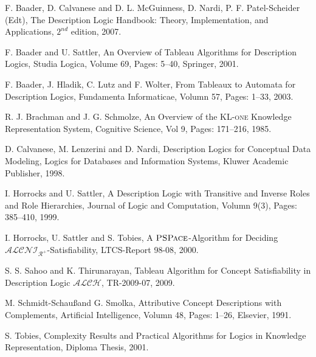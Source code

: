 \documentclass[12pt,a4paper]{report}
\begin{document}
\begin{thebibliography}{10}

F. Baader, D. Calvanese and D. L. McGuinness, D. Nardi, P. F. Patel-Scheider (Edt), The Description Logic Handbook: Theory, Implementation, and Applications, $2^{nd}$ edition, 2007.

F. Baader and U. Sattler, An Overview of Tableau Algorithms for Description Logics, Studia Logica, Volume 69, Pages: 5--40, Springer, 2001.

F. Baader, J. Hladik, C. Lutz and F. Wolter, From Tableaux to Automata for Description Logics, Fundamenta Informaticae, Volumn 57, Pages: 1--33, 2003.

R. J. Brachman and J. G. Schmolze, An Overview of  the  \textsc{KL-one} Knowledge  Representation System, Cognitive Science, Vol 9, Pages: 171--216, 1985.

D. Calvanese, M. Lenzerini and D. Nardi, Description Logics for Conceptual Data Modeling, Logics for Databases and Information Systems, Kluwer Academic Publisher, 1998.

I. Horrocks and U. Sattler, A Description Logic with Transitive and Inverse Roles and Role Hierarchies, Journal of Logic and Computation, Volumn 9(3), Pages: 385--410, 1999.

I. Horrocks, U. Sattler and S. Tobies, A $\textsc{PSPace}$-Algorithm for Deciding $\mathcal{ALCNI}_{\mathcal{R}^+}$-Satisfiability, LTCS-Report 98-08, 2000.

S. S. Sahoo and K. Thirunarayan, Tableau Algorithm for Concept Satisfiability in Description Logic $\mathcal{ALCH}$, TR-2009-07, 2009.

M. Schmidt-Schau\ss and G. Smolka, Attributive Concept Descriptions with Complements, Artificial Intelligence, Volumn 48, Pages: 1--26, Elsevier, 1991.

S. Tobies, Complexity Results and Practical Algorithms for Logics in Knowledge Representation, Diploma Thesis, 2001.

\end{thebibliography}
\end{document}
